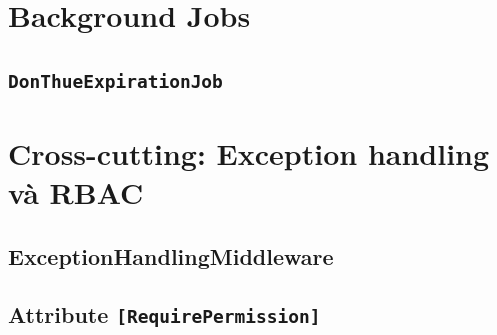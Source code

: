 \section{Background Jobs}
\label{sec:background_jobs}

\subsection{\texttt{DonThueExpirationJob}}

\section{Cross-cutting: Exception handling và RBAC}
\label{sec:cross_cutting}

\subsection{ExceptionHandlingMiddleware}

\subsection{Attribute \texttt{[RequirePermission]}}

